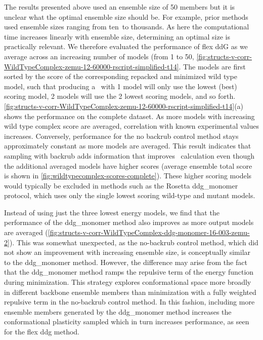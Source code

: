 The results presented above used an ensemble size of 50 members but it is unclear what the optimal ensemble size should be. For example, prior methods used ensemble sizes ranging from ten\cite{kamisetty_accounting_2011}\ to thousands\cite{benedix_predicting_2009}. As here the computational time increases linearly with ensemble size, determining an optimal size is practically relevant. We therefore evaluated the performance of flex ddG as we average across an increasing number of models (from 1 to 50, \cref{fig:structs-v-corr-WildTypeComplex-zemu-12-60000-rscript-simplified-t14}.
The models are first sorted by the score of the corresponding repacked and minimized wild type model, such that producing a \ddg\ with 1 model will only use the lowest (best) scoring model, 2 models will use the 2 lowest scoring models, and so forth.
\cref{fig:structs-v-corr-WildTypeComplex-zemu-12-60000-rscript-simplified-t14}(a) shows the performance on the complete dataset.
As more models with increasing wild type complex score are averaged, correlation with known experimental values increases.
Conversely, performance for the no backrub control method stays approximately constant as more models are averaged.
This result indicates that sampling with backrub adds information that improves \ddg\ calculation even though the additional averaged models have higher scores (average ensemble total score is shown in \cref{fig:wildtypecomplex-scores-complete}).
These higher scoring models would typically be excluded in methods such as the Rosetta ddg\_monomer protocol, which uses only the single lowest scoring wild-type and mutant models.

Instead of using just the three lowest energy models\cite{kellogg_role_2011}, we find that the performance of the ddg\_monomer method also improves as more output models are averaged (\cref{fig:structs-v-corr-WildTypeComplex-ddg-monomer-16-003-zemu-2}).
This was somewhat unexpected, as the no-backrub control method, which did not show an improvement with increasing ensemble size, is conceptually similar to the ddg\_monomer method. However, the difference may arise from the fact that the ddg\_monomer method ramps the repulsive term of the energy function during minimization. This strategy explores conformational space more broadly in different backbone ensemble members than minimization with a fully weighted repulsive term in the no-backrub control method. In this fashion, including more ensemble members generated by the ddg\_monomer method increases the conformational plasticity sampled which in turn increases performance, as seen for the flex ddg method.

